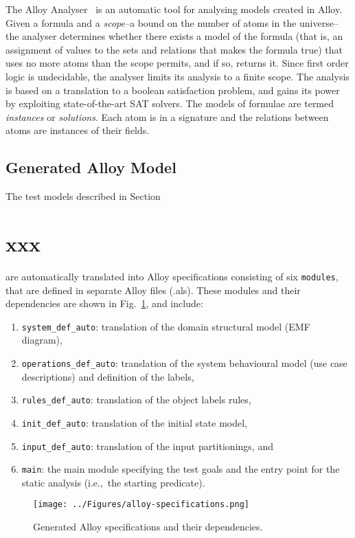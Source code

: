 The Alloy Analyser~\cite{Jackson2000} is an automatic tool for analysing models created in Alloy. Given a formula and a \textit{scope}--a bound on the number of atoms in the universe--the analyser determines whether there exists a model of the formula (that is, an assignment of values to the sets and relations that makes the formula true) that uses no more atoms than the scope permits, and if so, returns it. Since first order logic is undecidable, the analyser limits its analysis to a finite scope. The analysis is based on a translation to a boolean satisfaction problem, and gains its power by exploiting state-of-the-art SAT solvers. The models of formulae are termed \textit{instances} or \textit{solutions}. Each atom is in a signature and the relations between atoms are instances of their fields.

\subsection{Generated Alloy Model}
\label{sec:test-generation-execution-alloy-models}
The test models described in Section~\section{xxx} are automatically translated into Alloy specifications consisting of six \texttt{modules}, that are defined in separate Alloy files (.als). These modules and their dependencies are shown in Fig.~\ref{fig:alloy-specifications}, and include:

\begin{enumerate}
	\item \texttt{system\_def\_auto}: translation of the domain structural model (EMF diagram),
	\item \texttt{operations\_def\_auto}: translation of the system behavioural model (use case descriptions) and definition of the labels,
	\item \texttt{rules\_def\_auto}: translation of the object labels rules,
	\item \texttt{init\_def\_auto}: translation of the initial state model, 
	\item \texttt{input\_def\_auto}: translation of the input partitionings, and
	\item \texttt{main}: the main module specifying the test goals and the entry point for the static analysis (i.e.,\ the starting predicate).
\end{enumerate}

\begin{figure}[h]
\centering
\texttt{[image: ../Figures/alloy-specifications.png]}
\caption{Generated Alloy specifications and their dependencies.}
\label{fig:alloy-specifications}
\end{figure}

